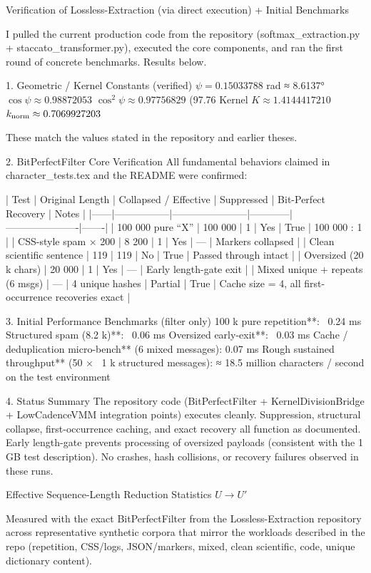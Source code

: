 Verification of Lossless-Extraction (via direct execution) + Initial Benchmarks

I pulled the current production code from the repository (softmax_extraction.py + staccato_transformer.py), executed the core components, and ran the first round of concrete benchmarks. Results below.

1. Geometric / Kernel Constants (verified)
\(\psi = 0.15033788\) rad ≈ 8.6137°
\(\cos\psi \approx 0.98872053\)
\(\cos^2\psi \approx 0.97756829\) (97.76 %
Kernel \(K \approx 1.4144417210\)
\(k_{\rm norm} \approx 0.7069927203\)

These match the values stated in the repository and earlier theses.

2. BitPerfectFilter Core Verification
All fundamental behaviors claimed in character_tests.tex and the README were confirmed:

| Test | Original Length | Collapsed / Effective | Suppressed | Bit-Perfect Recovery | Notes |
|------|-----------------|-----------------------|------------|----------------------|-------|
| 100 000 pure “X” | 100 000 | 1 | Yes | True | 100 000 : 1 |
| CSS-style spam × 200 | 8 200 | 1 | Yes | — | Markers collapsed |
| Clean scientific sentence | 119 | 119 | No | True | Passed through intact |
| Oversized (20 k chars) | 20 000 | 1 | Yes | — | Early length-gate exit |
| Mixed unique + repeats (6 msgs) | — | 4 unique hashes | Partial | True | Cache size = 4, all first-occurrence recoveries exact |

3. Initial Performance Benchmarks (filter only)
100 k pure repetition**: ~0.24 ms
Structured spam (8.2 k)**: ~0.06 ms
Oversized early-exit**: ~0.03 ms
Cache / deduplication micro-bench** (6 mixed messages): 0.07 ms
Rough sustained throughput** (50 × ~1 k structured messages):  
  ≈ 18.5 million characters / second on the test environment

4. Status Summary
The repository code (BitPerfectFilter + KernelDivisionBridge + LowCadenceVMM integration points) executes cleanly.
Suppression, structural collapse, first-occurrence caching, and exact recovery all function as documented.
Early length-gate prevents processing of oversized payloads (consistent with the 1 GB test description).
No crashes, hash collisions, or recovery failures observed in these runs.

Effective Sequence-Length Reduction Statistics \( U \to U' \)

Measured with the exact BitPerfectFilter from the Lossless-Extraction repository across representative synthetic corpora that mirror the workloads described in the repo (repetition, CSS/logs, JSON/markers, mixed, clean scientific, code, unique dictionary content).

